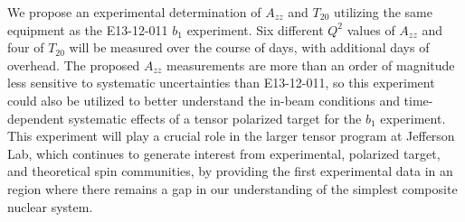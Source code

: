 We propose an experimental determination of $A_{zz}$ and $T_{20}$ utilizing the same equipment as the E13-12-011 $b_1$ experiment.  Six different $Q^2$ values of $A_{zz}$ and four of $T_{20}$ will be measured over the course of \productiondays days, with \overheaddays additional days of overhead. The proposed $A_{zz}$ measurements are more than an order of magnitude less sensitive to systematic uncertainties than E13-12-011, so this experiment could also be utilized to better understand the in-beam conditions and time-dependent systematic effects of a tensor polarized target for the $b_1$ experiment. This experiment will play a crucial role in the larger tensor program at Jefferson Lab, which continues to generate interest from experimental, polarized target, and theoretical spin communities, by providing the first experimental data in an region where there remains a gap in our understanding of the simplest composite nuclear system.










